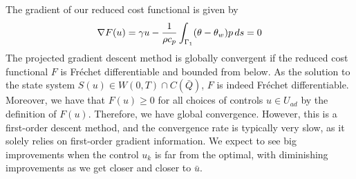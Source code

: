 The gradient of our reduced cost functional is given by
%
\begin{equation*}
    \nabla F(u) =  \gamma u - \frac{1}{\rho c_p} \int_{\Gamma_1} (\theta - \theta_w)p \mathop{ds} = 0
\end{equation*}
%
The projected gradient descent method is globally convergent if the reduced cost functional $F$ is Fréchet differentiable and bounded from below. As the solution to the state system $S(u) \in W(0,T) \cap C(\bar{Q})$, $F$ is indeed Fréchet differentiable. Moreover, we have that $F(u) \geq 0$ for all choices of controls $u \in U_{ad}$ by the definition of $F(u)$. Therefore, we have global convergence. However, this is a first-order descent method, and the convergence rate is typically very slow, as it solely relies on first-order gradient information. We expect to see big improvements when the control $u_k$ is far from the optimal, with diminishing improvements as we get closer and closer to $\bar{u}$. \bigskip 

